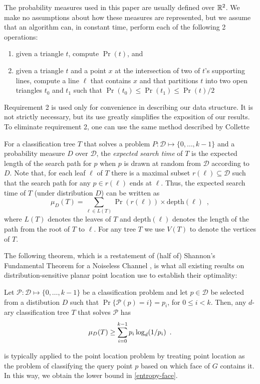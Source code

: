 \documentclass[lotsofwhite]{patmorin}
\newcommand{\depth}{\mathrm{depth}}
\begin{document}
The probability measures used in this paper are usually defined over
$\mathbb{R}^2$.  We make no assumptions about how these measures are
represented, but we assume that an algorithm can, in constant time,
perform each of the following 2 operations:
\begin{enumerate}
\item given a triangle $t$, compute $\Pr(t)$, and
\item given a triangle $t$ and a point $x$ at the
intersection of two of $t$'s supporting lines, compute a line $\ell$
that contains $x$ and that partitions $t$ into two open triangles
$t_0$ and $t_1$ such that $\Pr(t_0)\le\Pr(t_1)\le\Pr(t)/2$
\end{enumerate}
Requirement 2 is used only for convenience in describing our data
structure.  It is not strictly necessary, but its use greatly
simplifies the exposition of our results.  To eliminate requirement 2,
one can use the same method described by Collette \etal
\cite[Section~5]{cdilm08}

For a classification tree $T$ that solves a problem
$P:\mathcal{D}\mapsto\{0,\ldots,k-1\}$ and a probability measure $D$
over $\mathcal{D}$, the \emph{expected search time} of $T$ is the
expected length of the search path for $p$ when $p$ is drawn at random
from $\mathcal{D}$ according to $D$.  Note that, for each leaf $\ell$
of $T$ there is a maximal subset $r(\ell)\subseteq \mathcal{D}$ such
that the search path for any $p\in r(\ell)$ ends at $\ell$.  Thus, the
expected search time of $T$ (under distribution $D$) can be written as
\[
     \mu_D(T) = \sum_{\ell\in L(T)} \Pr(r(\ell))\times \depth(\ell)
	\enspace ,
\]
where $L(T)$ denotes the leaves of $T$ and $\depth(\ell)$ denotes the
length of the path from the root of $T$ to $\ell$.  For any tree $T$
we use $V(T)$ to denote the vertices of $T$.

The following theorem, which is a restatement of (half of) Shannon's
Fundamental Theorem for a Noiseless Channel \cite[Theorem 9]{s48}, is
what all existing results on distribution-sensitive planar point
location use to establish their optimality:

\begin{thm}
Let $\mathcal{P}:\mathcal{D}\mapsto \{0,\ldots,k-1\}$ be a classification
problem and let $p\in \mathcal{D}$ be selected from a distibution $D$ such
that $\Pr\{\mathcal{P}(p)= i\}=p_i$, for $0\le i< k$.  Then, any
$d$-ary classification tree $T$ that solves $\mathcal{P}$ has
\begin{equation}
     \mu_D(T) \ge \sum_{i=0}^{k-1} p_i\log_d(1/p_i) \enspace .
	\eqlabel{shannon}
\end{equation}
\end{thm}
 is typically applied to the point location problem by
treating point location as the problem of classifying the query point
$p$ based on which face of $G$ contains it.  In this way, we obtain
the lower bound in \eqref{entropy-face}.
\end{document}
